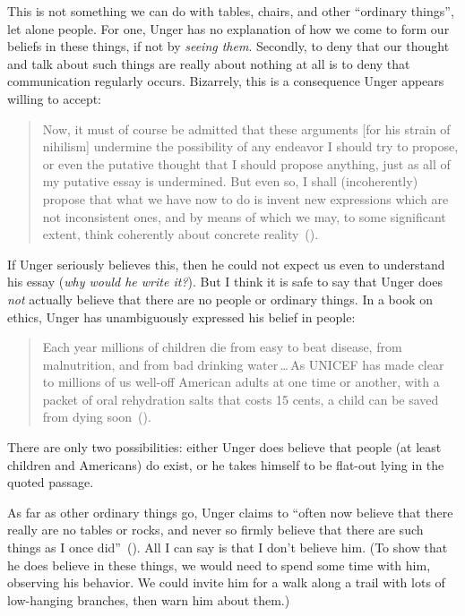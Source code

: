 \documentclass[11pt]{standalone} \newif\ifstandlone \standalonetrue
\newenvironment{squote}{%
	\begin{quote}\begin{singlespace}%
	}{%
	\end{singlespace}\end{quote}}
\begin{document}
\begin{spacing}{1.5}
\begin{enumerate}
This is not something we can do with tables, chairs, and other
``ordinary things'', let alone people.  For one, Unger has no
explanation of how we come to form our beliefs in these things, if not
by {\em seeing them}.  Secondly, to deny that our thought and talk
about such things are really about nothing at all is to deny that
communication regularly occurs.  Bizarrely, this is a consequence
Unger appears willing to accept:
\begin{squote}
Now, it must of course be admitted that these arguments [for his
  strain of nihilism] undermine the possibility of any endeavor I
should try to propose, or even the putative thought that I should
propose anything, just as all of my putative essay is undermined.  But
even so, I shall (incoherently) propose that what we have now to do is
invent new expressions which are not inconsistent ones, and by means
of which we may, to some significant extent, think coherently about
concrete reality~(\citeyear[544]{unger1980b}).
\end{squote}
If Unger seriously believes this, then he could not expect us even to
understand his essay ({\em why would he write it?}).  But I think it
is safe to say that Unger does {\em not} actually believe that there
are no people or ordinary things.  In a book on ethics, Unger has
unambiguously expressed his belief in people:

\begin{squote}
Each year millions of children die from easy to beat disease, from
malnutrition, and from bad drinking water\,\ldots\,As UNICEF has made
clear to millions of us well-off American adults at one time or
another, with a packet of oral rehydration salts that costs 15 cents,
a child can be saved from dying soon~(\citeyear[3]{unger1996}).
\end{squote}
There are only two possibilities: either Unger does believe that
people (at least children and Americans) do exist, or he takes himself
to be flat-out lying in the quoted passage.

As far as other ordinary things go, Unger claims to ``often now
believe that there really are no tables or rocks, and never so firmly
believe that there are such things as I once
did''~(\citeyear[543]{unger1980b}).  All I can say is that I don't
believe him.  (To show that he does believe in these things, we would
need to spend some time with him, observing his behavior.  We could
invite him for a walk along a trail with lots of low-hanging branches,
then warn him about them.)


\end{enumerate}
\end{spacing}
\end{document}
